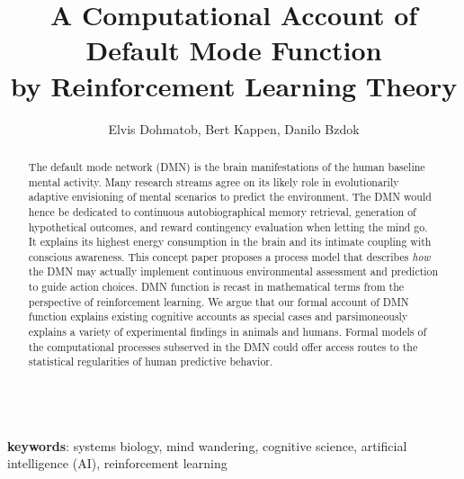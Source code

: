\documentclass[10pt,letterpaper]{article}
\date{}
\title{A Computational Account of Default Mode Function\\
  by
  Reinforcement Learning Theory}
\begin{document}
\author{Elvis Dohmatob, Bert Kappen, Danilo Bzdok\\
}

\maketitle


\begin{abstract}
The default mode network (DMN) is the brain manifestations of the human
baseline mental activity.
%
Many research streams agree on its likely role in evolutionarily adaptive
envisioning of mental scenarios to predict the environment.
The DMN would hence be dedicated to continuous autobiographical memory retrieval,
generation of hypothetical outcomes,
and reward contingency evaluation when letting the mind go.
It explains its highest energy consumption in the brain and
its intimate coupling with conscious awareness.
%
This concept paper proposes a process model that describes
\textit{how} the DMN may actually implement continuous
environmental assessment and prediction to guide action choices.
DMN function is recast in mathematical terms
from the perspective of
reinforcement learning.
We argue that our formal account of DMN function
explains existing cognitive accounts as special cases and
parsimoneously explains a variety of experimental findings
in animals and humans.
%
Formal models of the computational processes subserved in the DMN
could offer access routes to the statistical regularities
of human predictive behavior.
\end{abstract}

\textbf{\\keywords}: systems biology, mind wandering, cognitive science,
artificial intelligence (AI),
reinforcement learning

\tableofcontents
\listoffigures
\listoftables
\end{document}
